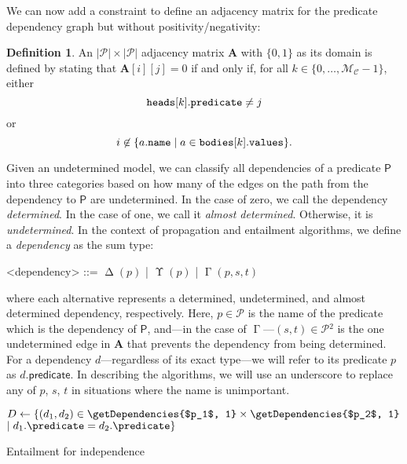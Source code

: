 \documentclass[letterpaper]{article}
\makeatletter
\theoremstyle{definition}
\newtheorem{definition}{Definition}
\newcommand{\nosemic}{\renewcommand{\@endalgocfline}{\relax}}%
\newcommand{\dosemic}{\renewcommand{\@endalgocfline}{\algocf@endline}}%
\newcommand{\variable}[1]{\texttt{\textup{#1}}}
\newcommand{\predicates}{\mathcal{P}}
\newcommand{\maxNumClauses}{\mathcal{M}_{\mathcal{C}}}
\DeclareMathOperator{\Determined}{\Delta}
\DeclareMathOperator{\Undetermined}{\Upsilon}
\DeclareMathOperator{\AlmostDetermined}{\Gamma}
\makeatother
\begin{document}
We can now add a constraint to define an adjacency matrix for the predicate
dependency graph but without positivity/negativity:

\begin{definition} \label{def:adjacency_matrix}
  An $|\predicates{}| \times |\predicates{}|$ adjacency matrix $\mathbf{A}$ with
  $\{ 0, 1 \}$ as its domain is defined by stating that $\mathbf{A}[i][j] = 0$
  if and only if, for all $k \in \{ 0, \dots, \maxNumClauses{} - 1 \}$, either
  \[
    \variable{heads}[k].\variable{predicate} \ne j
  \]
  or
  \[
    i \not\in \{a.\variable{name} \mid a \in
    \variable{bodies}[k].\variable{values} \}.
  \]
\end{definition}

Given an undetermined model, we can classify all dependencies of a predicate
$\mathsf{P}$ into three categories based on how many of the edges on the path
from the dependency to $\mathsf{P}$ are undetermined. In the case of zero, we
call the dependency \emph{determined}. In the case of one, we call it
\emph{almost determined}. Otherwise, it is \emph{undetermined}. In the context
of propagation and entailment algorithms, we define a \emph{dependency} as the
sum type:
\begin{grammar}
  <dependency> ::= $\Determined(p)$ | $\Undetermined(p)$ | $\AlmostDetermined(p,
  s, t)$
\end{grammar}
where each alternative represents a determined, undetermined, and almost
determined dependency, respectively. Here, $p \in \predicates{}$ is the name of
the predicate which is the dependency of $\mathsf{P}$, and---in the case of
$\AlmostDetermined$---$(s, t) \in \predicates{}^2$ is the one undetermined edge
in $\mathbf{A}$ that prevents the dependency from being determined. For a
dependency $d$---regardless of its exact type---we will refer to its predicate
$p$ as $d.\mathsf{predicate}$. In describing the algorithms, we will use an
underscore to replace any of $p$, $s$, $t$ in situations where the name is
unimportant.

\begin{algorithm}
  \nosemic $D \gets \{ (d_1, d_2) \in \getDependencies{$p_1$, 1} \times \getDependencies{$p_2$, 1}$\;
  \hspace{27pt}\dosemic $\mid d_1.\predicate = d_2.\predicate \}$\;
  \lIf{$\exists (\Determined \_, \Determined \_) \in D$}{\Return{\textsc{false}}}
  \;
  \caption{Entailment for independence}
  \label{alg:independence_entailment}
\end{algorithm}
\end{document}
